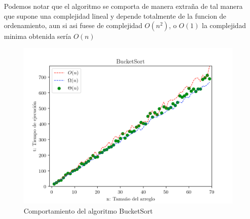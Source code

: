 \documentclass[12pt,twoside]{article}
\begin{document}
Podemos notar que el algoritmo se comporta de manera extraña de tal manera que supone una complejidad lineal y depende totalmente
de la funcion de ordenamiento, aun si asi fuese de complejidad $O(n^2)$, o $O(1)$ la complejidad minima obtenida sería $O(n)$
\begin{figure}
  \centering
    \includegraphics[height=0.75\textwidth]{Figure3}
  \caption{Comportamiento del algoritmo BucketSort}
  \label{fig:ejemplo1}
\end{figure}
\end{document}
